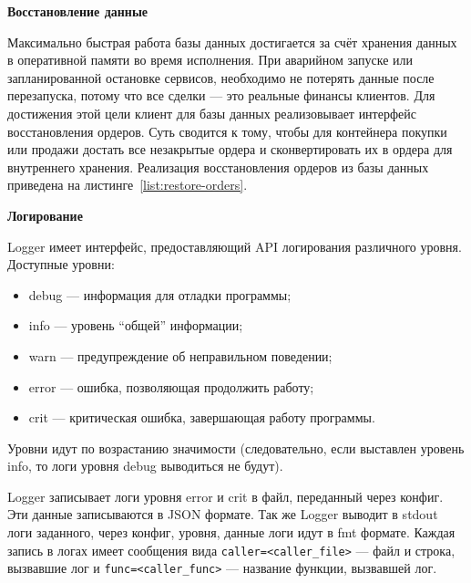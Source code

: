 \textbf{Восстановление данные}

Максимально быстрая работа базы данных достигается за счёт хранения данных в оперативной памяти во время исполнения. При аварийном запуске или запланированной остановке сервисов, необходимо не потерять данные после перезапуска, потому что все сделки — это реальные финансы клиентов. Для достижения этой цели клиент для базы данных реализовывает интерфейс восстановления ордеров. Суть сводится к тому, чтобы для контейнера покупки или продажи достать все незакрытые ордера и сконвертировать их в ордера для внутреннего хранения. Реализация восстановления ордеров из базы данных приведена на листинге~\ref{list:restore-orders}.



\textbf{Логирование}

Logger имеет интерфейс, предоставляющий API логирования различного уровня.
Доступные уровни:

\begin{itemize}
    \item debug — информация для отладки программы;
    \item info — уровень ``общей'' информации;
    \item warn — предупреждение об неправильном поведении;
    \item error — ошибка, позволяющая продолжить работу;
    \item crit — критическая ошибка, завершающая работу программы.
\end{itemize}

Уровни идут по возрастанию значимости (следовательно, если выставлен уровень info, то логи уровня debug выводиться не будут).

Logger записывает логи уровня error и crit в файл, переданный через конфиг. Эти данные записываются в JSON формате. Так же Logger выводит в stdout логи заданного, через конфиг, уровня, данные логи идут в fmt формате. Каждая запись в логах имеет сообщения вида \lstinline{caller=<caller_file>} — файл и строка, вызвавшие лог и \lstinline{func=<caller_func>} — название функции, вызвавшей лог.

